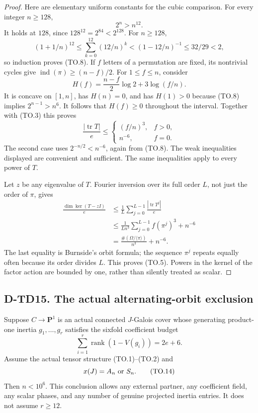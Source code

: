 \begin{proof}
Here are elementary uniform constants for the cubic comparison.
For every integer \(n\ge128\),
\[
                          2^n>n^{12}.
 \tag{TO.8}
\]
It holds at \(128\), since \(128^{12}=2^{84}<2^{128}\).
For \(n\ge128\),
\[
 (1+1/n)^{12}
 \le\sum_{k=0}^{12}(12/n)^k
 <(1-12/n)^{-1}\le32/29<2,
 \tag{TO.9}
\]
so induction proves (TO.8).
If \(f\) letters of a permutation are fixed, its nontrivial
cycles give \(\operatorname{ind}(\pi)\ge(n-f)/2\).
For \(1\le f\le n\), consider
\[
 H(f)=\frac{n-f}{2}\log2+3\log(f/n).
 \tag{TO.10}
\]
It is concave on \([1,n]\), has \(H(n)=0\), and has
\(H(1)>0\) because (TO.8) implies \(2^{n-1}>n^6\).
It follows that \(H(f)\ge0\) throughout the interval.
Together with (TO.3) this proves
\[
 \frac{|\operatorname{tr}T|}{e}\le
 \begin{cases}
       (f/n)^3,&f>0,\\
       n^{-6},&f=0.
 \end{cases}
 \tag{TO.11}
\]
The second case uses \(2^{-n/2}<n^{-6}\), again from (TO.8).
The weak inequalities displayed are convenient and sufficient.
The same inequalities apply to every power of \(T\).

Let \(z\) be any eigenvalue of \(T\). Fourier inversion over its
full order \(L\), not just the order of \(\pi\), gives
\[
 \begin{split}
 \frac{\dim\ker(T-zI)}e
  &\le\frac1L\sum_{j=0}^{L-1}
                       \frac{|\operatorname{tr}T^j|}{e}\\
  &\le\frac1{Ln^3}\sum_{j=0}^{L-1} f(\pi^j)^3+n^{-6}\\
  &=\frac{\#(\Omega/\langle\pi\rangle)}{n^3}+n^{-6}.
 \end{split}
 \tag{TO.12}
\]
The last equality is Burnside's orbit formula; the sequence
\(\pi^j\) repeats equally often because its order divides \(L\).
This proves (TO.5). Powers in the kernel of the factor action
are bounded by one, rather than silently treated as scalar.
\end{proof}

\subsection*{D-TD15. The actual alternating-orbit exclusion}

\begin{theorem}[D-TD15]
Suppose \(C\longrightarrow\mathbf P^1\) is an actual connected
\(J\)-Galois cover whose generating product-one inertia
\(g_1,\ldots,g_r\) satisfies the sixfold coefficient budget
\[
             \sum_{i=1}^r\operatorname{rank}(1-V(g_i))=2e+6.
 \tag{TO.13}
\]
Assume the actual tensor structure (TO.1)--(TO.2) and
\[
                           x(J)=A_n\ \hbox{or}\ S_n.
 \tag{TO.14}
\]
Then \(n<10^6\). This conclusion allows any external partner,
any coefficient field, any scalar phases, and any number of
genuine projected inertia entries. It does not assume \(r\ge12\).
\end{theorem}

